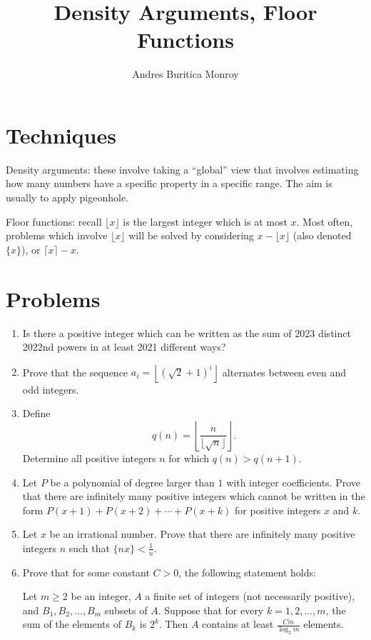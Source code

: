 \documentclass{article}
\title{Density Arguments, Floor Functions}
\author{Andres Buritica Monroy}
\date{}
\begin{document}
\maketitle
\section{Techniques}
Density arguments: these involve taking a ``global'' view that involves
estimating how many numbers have a specific property in a specific range.
The aim is usually to apply pigeonhole.

Floor functions: recall $\lfloor x\rfloor$ is the largest integer which is at
most $x$. Most often, problems which involve $\lfloor x\rfloor$ will be
solved by considering $x-\lfloor x\rfloor$ (also denoted $\{x\}$), or $\lceil
	x\rceil-x$.
\section{Problems}
\begin{enumerate}
	\item Is there a positive integer which can be written as the sum of 2023
	      distinct 2022nd powers in at least 2021 different ways?
	\item Prove that the sequence $a_i=\left\lfloor(\sqrt 2+1)^i\right\rfloor$
	      alternates between even and odd integers.
	\item Define
	      \[q(n)=\left\lfloor\frac n{\lfloor\sqrt n\rfloor}\right\rfloor.\]
	      Determine all positive integers $n$ for which $q(n)>q(n+1)$.
	\item Let $P$ be a polynomial of degree larger than $1$ with integer
	      coefficients. Prove that there are infinitely many positive integers which cannot be
	      written in the form $P(x+1)+P(x+2)+\cdots+P(x+k)$ for positive integers $x$
	      and $k$.
	\item Let $x$ be an irrational number. Prove that there are infinitely many
	      positive integers $n$ such that $\{nx\}<\frac 1n$.
	\item Prove that for some constant $C>0$, the following statement holds:

	      Let $m\ge 2$ be an integer, $A$ a finite set of integers (not
	      necessarily positive), and $B_1,B_2,\ldots,B_m$ subsets of $A$. Suppose
	      that for every $k=1,2,\ldots,m$, the sum of the elements of $B_k$ is
	      $2^k$. Then $A$ contains at least $\frac {Cm}{\log_2 m}$ elements.
\end{enumerate}
\newpage
\end{document}
